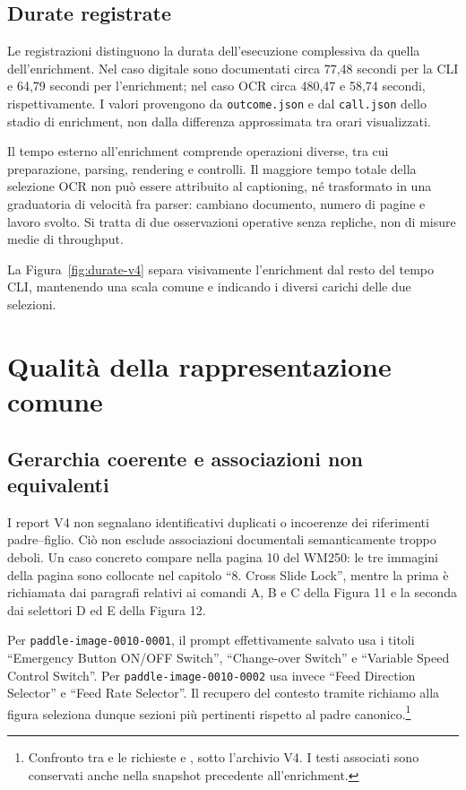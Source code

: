 \subsection{Durate registrate}

Le registrazioni distinguono la durata dell'esecuzione complessiva da quella dell'enrichment. Nel caso digitale sono documentati circa 77,48 secondi per la CLI e 64,79 secondi per l'enrichment; nel caso OCR circa 480,47 e 58,74 secondi, rispettivamente. I valori provengono da \texttt{outcome.json} e dal \texttt{call.json} dello stadio di enrichment, non dalla differenza approssimata tra orari visualizzati.

Il tempo esterno all'enrichment comprende operazioni diverse, tra cui preparazione, parsing, rendering e controlli. Il maggiore tempo totale della selezione OCR non può essere attribuito al captioning, né trasformato in una graduatoria di velocità fra parser: cambiano documento, numero di pagine e lavoro svolto. Si tratta di due osservazioni operative senza repliche, non di misure medie di throughput.

La Figura~\ref{fig:durate-v4} separa visivamente l'enrichment dal resto del tempo CLI, mantenendo una scala comune e indicando i diversi carichi delle due selezioni.



\section{Qualità della rappresentazione comune}
\label{sec:risultati-asset}

\subsection{Gerarchia coerente e associazioni non equivalenti}

I report V4 non segnalano identificativi duplicati o incoerenze dei riferimenti padre--figlio. Ciò non esclude associazioni documentali semanticamente troppo deboli. Un caso concreto compare nella pagina 10 del WM250: le tre immagini della pagina sono collocate nel capitolo \enquote{8. Cross Slide Lock}, mentre la prima è richiamata dai paragrafi relativi ai comandi A, B e C della Figura 11 e la seconda dai selettori D ed E della Figura 12.

Per \texttt{paddle-image-0010-0001}, il prompt effettivamente salvato usa i titoli \enquote{Emergency Button ON/OFF Switch}, \enquote{Change-over Switch} e \enquote{Variable Speed Control Switch}. Per \texttt{paddle-image-0010-0002} usa invece \enquote{Feed Direction Selector} e \enquote{Feed Rate Selector}. Il recupero del contesto tramite richiamo alla figura seleziona dunque sezioni più pertinenti rispetto al padre canonico.\footnote{Confronto tra  e le richieste  e , sotto l'archivio V4. I testi associati sono conservati anche nella snapshot precedente all'enrichment.}


